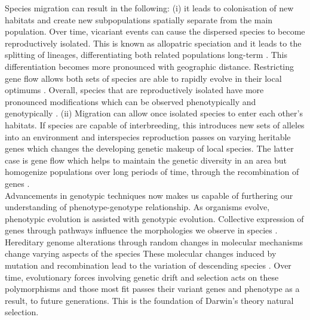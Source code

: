Species migration can result in the following: (i) it leads to colonisation of new habitats and create new subpopulations spatially separate from the main population. Over time, vicariant events can cause the dispersed species to become reproductively isolated. This is known as allopatric speciation and it leads to the splitting of lineages, differentiating both related populations long-term \cite{barber1999patterns,coyne1992genetics}. This differentiation becomes more pronounced with geographic distance. Restricting gene flow allows both sets of species are able to rapidly evolve in their local optimums \cite{garcia1997genetic}. Overall, species that are reproductively isolated have more pronounced modifications which can be observed phenotypically and genotypically \cite{pongratz2002genetic,sato2006effect}. (ii) Migration can allow once isolated species to enter each other’s habitats. If species are capable of interbreeding, this introduces new sets of alleles into an environment and interspecies reproduction passes on varying heritable genes which changes the developing genetic makeup of local species. The latter case is gene flow which helps to maintain the genetic diversity in an area but homogenize populations over long periods of time, through the recombination of genes \cite{sato2006effect,garcia1997genetic}.\\
Advancements in genotypic techniques now makes us capable of furthering our understanding of phenotype-genotype relationship. As organisms evolve, phenotypic evolution is assisted with genotypic evolution. Collective expression of genes through pathways influence the morphologies we observe in species \cite{hinman2009evolution}. Hereditary genome alterations through random changes in molecular mechanisms change varying aspects of the species \cite{chandrasekaran2008origins} These molecular changes induced by mutation and recombination lead to the variation of descending species \cite{chandrasekaran2008origins,ohno1999gene,brown2002genomes}. Over time, evolutionary forces involving genetic drift and selection acts on these polymorphisms and those most fit passes their variant genes and phenotype as a result, to future generations. This is the foundation of Darwin’s theory natural selection.\\
